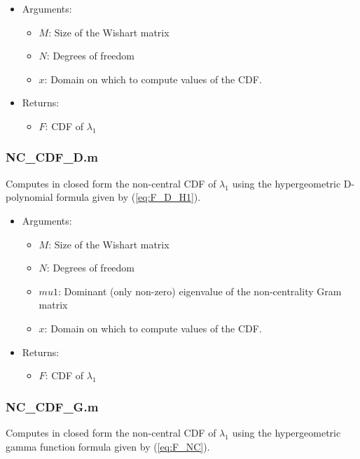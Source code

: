 \begin{itemize}
\item Arguments:
\begin{itemize}
\item $M$: Size of the Wishart matrix
\item $N$: Degrees of freedom
\item $x$: Domain on which to compute values of the CDF.
\end{itemize}
\item Returns:
\begin{itemize}
\item $F$: CDF of $\lambda_1$
\end{itemize}
\end{itemize}

\subsubsection*{NC\_CDF\_D.m}

Computes in closed form the non-central CDF of $\lambda_1$ using the hypergeometric D-polynomial formula given by (\ref{eq:F_D_H1}). 

\begin{itemize}
\item Arguments:
\begin{itemize}
\item $M$: Size of the Wishart matrix
\item $N$: Degrees of freedom
\item $mu1$: Dominant (only non-zero) eigenvalue of the non-centrality Gram matrix
\item $x$: Domain on which to compute values of the CDF.
\end{itemize}
\item Returns:
\begin{itemize}
\item $F$: CDF of $\lambda_1$
\end{itemize}
\end{itemize}


\subsubsection*{NC\_CDF\_G.m}

Computes in closed form the non-central CDF of $\lambda_1$ using the hypergeometric gamma function formula given by (\ref{eq:F_NC}). 

